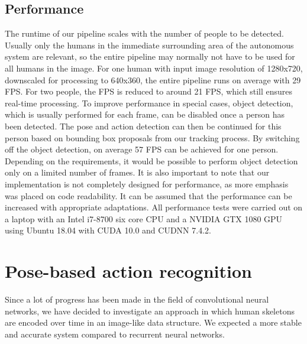 \documentclass[a4paper, 10pt, conference]{ieeeconf}
\begin{document}
\begin{minipage}{\textwidth}
\subsection{Performance}
\label{sec:performance}
The runtime of our pipeline scales with the number of people to be detected. Usually only the humans in the immediate surrounding area of the autonomous system are relevant, so the entire pipeline may normally not have to be used for all humans in the image. For one human with input image resolution of 1280x720, downscaled for processing to 640x360, the entire pipeline runs on average with 29 FPS. For two people, the FPS is reduced to around 21 FPS, which still ensures real-time processing. To improve performance in special cases, object detection, which is usually performed for each frame, can be disabled once a person has been detected. The pose and action detection can then be continued for this person based on bounding box proposals from our tracking process. By switching off the object detection, on average 57 FPS can be achieved for one person. Depending on the requirements, it would be possible to perform object detection only on a limited number of frames. It is also important to note that our implementation is not completely designed for performance, as more emphasis was placed on code readability. It can be assumed that the performance can be increased with appropriate adaptations. All performance tests were carried out on a laptop with an Intel i7-8700 six core CPU and a NVIDIA GTX 1080 GPU using Ubuntu 18.04 with CUDA 10.0 and CUDNN 7.4.2.

\section{Pose-based action recognition}
\label{sec:pipeline_action_rec}
  
Since a lot of progress has been made in the field of convolutional neural networks, we have decided to investigate an approach in which human skeletons are encoded over time in an image-like data structure. We expected a more stable and accurate system compared to recurrent neural networks. 


\end{minipage}
\end{document}
